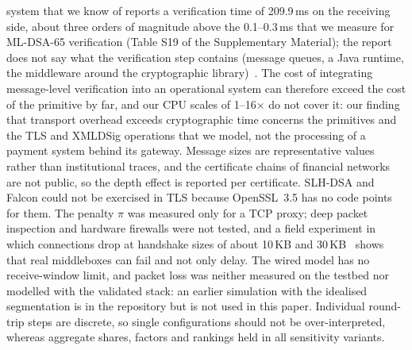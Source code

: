 \documentclass[preprint,12pt]{elsarticle}
\newcommand{\ms}{\,ms\xspace}
\newcommand{\KB}{\,KB\xspace}
\newcommand{\supp}[1]{#1 of the Supplementary Material}
\begin{document}
system that we know of reports a verification time of 209.9\ms on the receiving side, about three orders of magnitude above the 0.1--0.3\ms that we measure for ML-DSA-65 verification (\supp{Table S19}); the report does not say what the verification step contains (message queues, a Java runtime, the middleware around the cryptographic library)~\cite{bis_leap2025}. The cost of integrating message-level verification into an operational system can therefore exceed the cost of the primitive by far, and our CPU scales of 1--16$\times$ do not cover it: our finding that transport overhead exceeds cryptographic time concerns the primitives and the TLS and XMLDSig operations that we model, not the processing of a payment system behind its gateway. Message sizes are representative values rather than institutional traces, and the certificate chains of financial networks are not public, so the depth effect is reported per certificate. SLH-DSA and Falcon could not be exercised in TLS because OpenSSL~3.5 has no code points for them. The penalty $\pi$ was measured only for a TCP proxy; deep packet inspection and hardware firewalls were not tested, and a field experiment in which connections drop at handshake sizes of about 10\KB and 30\KB~\cite{westerbaan2021} shows that real middleboxes can fail and not only delay. The wired model has no receive-window limit, and packet loss was neither measured on the testbed nor modelled with the validated stack: an earlier simulation with the idealised segmentation is in the repository but is not used in this paper. Individual round-trip steps are discrete, so single configurations should not be over-interpreted, whereas aggregate shares, factors and rankings held in all sensitivity variants.

\end{document}
